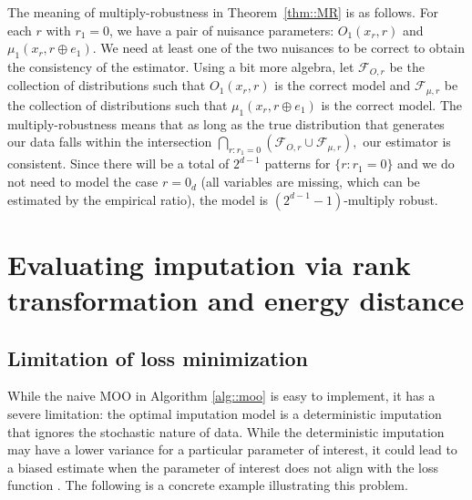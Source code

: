 \documentclass[aos, preprint]{imsart}
\theoremstyle{plain}
\theoremstyle{definition}
\newtheorem{remark}[theorem]{Remark}
\newcommand{\E}{\mbox{$\mathbb{E}$}}
\begin{document}
	The meaning of multiply-robustness in Theorem~\ref{thm::MR}
	is as follows. 
	For each $r$ with $r_{1} = 0$, 
	we have a pair of nuisance parameters: $O_1(x_r,r)$ and $\mu_1(x_r,r\oplus e_1)$.
	We need at least one of the two nuisances to be correct
	to obtain the consistency of the estimator. 
	Using a bit more algebra, let $\mathcal{F}_{O, r}$ be the collection of distributions such that $O_1(x_r,r)$ is the correct model
	and $\mathcal{F}_{\mu, r}$ be the collection of distributions such that $\mu_1(x_r,r\oplus e_1)$ is the correct model. 
	The multiply-robustness means that as long as the true distribution that generates our data falls within the intersection
	$
	\bigcap_{r: r_1 = 0 } \left(\mathcal{F}_{O, r}\cup \mathcal{F}_{\mu, r}\right),
	$
	our estimator is consistent.
	Since there will be a total of $2^{d-1}$ patterns  for $\{r: r_1 = 0\}$ and we do not need to model the case $r=0_d$ (all variables are missing, which can be
	estimated by the empirical ratio), 
	the model is $(2^{d-1}-1)$-multiply robust.
	




\section{Evaluating imputation via rank transformation and energy distance}	\label{sec::QT}


\subsection{Limitation of loss minimization}

While the naive MOO in Algorithm \ref{alg::moo} is easy to implement, it has a severe limitation:
the optimal imputation model is a deterministic imputation that ignores the stochastic nature of data.
While the deterministic imputation may have a lower variance for a particular parameter of interest,
it could lead to a biased estimate
when the parameter of interest does not align with the loss function \citep{von2025imputing}.
The following is a concrete example illustrating this problem.
\end{document}
